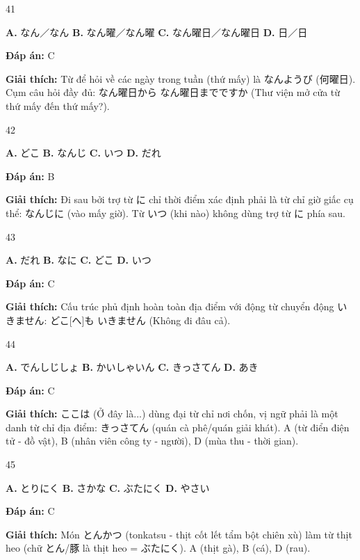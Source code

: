 \documentclass[12pt,a4paper]{report}
\newcommand{\source}[1]{}
\newcommand{\choice}[2]{\textbf{#1.} #2 \quad}
\newcommand{\answer}[1]{\par\textbf{Đáp án:} #1}
\newcommand{\confidence}[1]{}
\newcommand{\explain}[1]{\par\textbf{Giải thích:} #1\vspace{0.5cm}}
\begin{document}
\begin{question}{41}
\source{Q18.webp}
\choice{A}{なん／なん}
\choice{B}{なん曜／なん曜}
\choice{C}{なん曜日／なん曜日}
\choice{D}{日／日}
\answer{C}
\confidence{high}
\explain{Từ để hỏi về các ngày trong tuần (thứ mấy) là なんようび (何曜日). Cụm câu hỏi đầy đủ: なん曜日から なん曜日までですか (Thư viện mở cửa từ thứ mấy đến thứ mấy?).}
\end{question}

\begin{question}{42}
\source{Q19.webp}
\choice{A}{どこ}
\choice{B}{なんじ}
\choice{C}{いつ}
\choice{D}{だれ}
\answer{B}
\confidence{high}
\explain{Đi sau bởi trợ từ に chỉ thời điểm xác định phải là từ chỉ giờ giấc cụ thể: なんじに (vào mấy giờ). Từ いつ (khi nào) không dùng trợ từ に phía sau.}
\end{question}

\begin{question}{43}
\source{Q21.webp}
\choice{A}{だれ}
\choice{B}{なに}
\choice{C}{どこ}
\choice{D}{いつ}
\answer{C}
\confidence{high}
\explain{Cấu trúc phủ định hoàn toàn địa điểm với động từ chuyển động いきません: どこ[へ]も いきません (Không đi đâu cả).}
\end{question}

\begin{question}{44}
\source{Q23.webp}
\choice{A}{でんしじしょ}
\choice{B}{かいしゃいん}
\choice{C}{きっさてん}
\choice{D}{あき}
\answer{C}
\confidence{high}
\explain{ここは (Ở đây là...) dùng đại từ chỉ nơi chốn, vị ngữ phải là một danh từ chỉ địa điểm: きっさてん (quán cà phê/quán giải khát). A (từ điển điện tử - đồ vật), B (nhân viên công ty - người), D (mùa thu - thời gian).}
\end{question}

\begin{question}{45}
\source{Q24.webp}
\choice{A}{とりにく}
\choice{B}{さかな}
\choice{C}{ぶたにく}
\choice{D}{やさい}
\answer{C}
\confidence{high}
\explain{Món とんかつ (tonkatsu - thịt cốt lết tẩm bột chiên xù) làm từ thịt heo (chữ とん/豚 là thịt heo = ぶたにく). A (thịt gà), B (cá), D (rau).}
\end{question}
\end{document}
